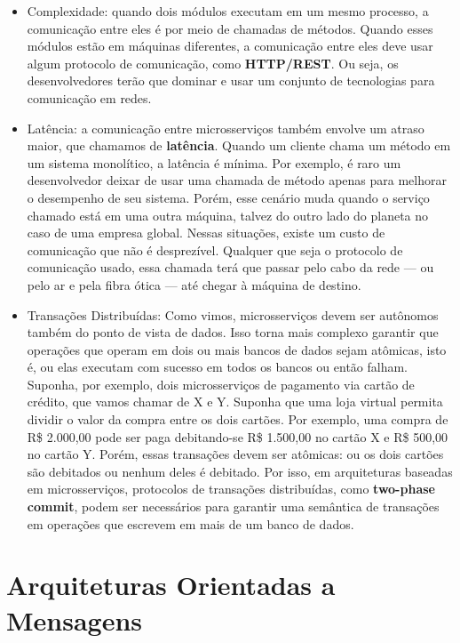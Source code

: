 \documentclass[
  11pt,
  twoside]{book}
\begin{document}
\begin{itemize}
\item
  Complexidade: quando dois módulos executam em um mesmo processo, a
  comunicação entre eles é por meio de chamadas de métodos. Quando esses
  módulos estão em máquinas diferentes, a comunicação entre eles deve
  usar algum protocolo de comunicação, como \textbf{HTTP/REST}.
   Ou seja, os desenvolvedores terão que dominar e usar um
  conjunto de tecnologias para comunicação em redes.
\item
  Latência: a comunicação entre microsserviços também envolve um atraso
  maior, que chamamos de \textbf{latência}.  Quando um
  cliente chama um método em um sistema monolítico, a latência é mínima.
  Por exemplo, é raro um desenvolvedor deixar de usar uma chamada de
  método apenas para melhorar o desempenho de seu sistema. Porém, esse
  cenário muda quando o serviço chamado está em uma outra máquina,
  talvez do outro lado do planeta no caso de uma empresa global. Nessas
  situações, existe um custo de comunicação que não é desprezível.
  Qualquer que seja o protocolo de comunicação usado, essa chamada terá
  que passar pelo cabo da rede --- ou pelo ar e pela fibra ótica --- até
  chegar à máquina de destino.
\item
  Transações Distribuídas: Como vimos, microsserviços devem ser
  autônomos também do ponto de vista de dados. Isso torna mais complexo
  garantir que operações que operam em dois ou mais bancos de dados
  sejam atômicas, isto é, ou elas executam com sucesso em todos os
  bancos ou então falham. Suponha, por exemplo, dois microsserviços de
  pagamento via cartão de crédito, que vamos chamar de X e Y. Suponha
  que uma loja virtual permita dividir o valor da compra entre os dois
  cartões. Por exemplo, uma compra de R\$ 2.000,00 pode ser paga
  debitando-se R\$ 1.500,00 no cartão X e R\$ 500,00 no cartão Y. Porém,
  essas transações devem ser atômicas: ou os dois cartões são debitados
  ou nenhum deles é debitado. Por isso, em arquiteturas baseadas em
  microsserviços, protocolos de transações distribuídas, como
  \textbf{two-phase commit}, 
   podem ser necessários para garantir uma
  semântica de transações em operações que escrevem em mais de um banco
  de dados.
\end{itemize}

\hypertarget{arquiteturas-orientadas-a-mensagens}{%
\section{Arquiteturas Orientadas a
Mensagens}\label{arquiteturas-orientadas-a-mensagens}}
\end{document}
